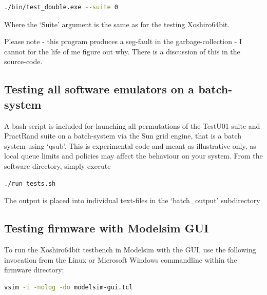 \documentclass{article}
\begin{document}
\begin{minipage}{1.0\textwidth}
\centering
\begin{lstlisting}[language=bash, label=lst:SwTestU01Double]
./bin/test_double.exe --suite 0
\end{lstlisting}
\end{minipage}

Where the `Suite' argument is the same as for the testing Xoshiro64bit.

Please note - this program produces a seg-fault in the garbage-collection - I cannot for the life of me figure out why. There is a discussion of this in the source-code.

\subsection{Testing all software emulators on a batch-system}

A bash-script is included for launching all permutations of the TestU01 suite and PractRand suite on a batch-system via the Sun grid engine, that is a batch system using `qsub'. This is experimental code and meant as illustrative only, as local queue limits and policies may affect the behaviour on your system. From the software directory, simply execute

\begin{minipage}{1.0\textwidth}
\centering
\begin{lstlisting}[language=bash, label=lst:RunTestsSh]
./run_tests.sh
\end{lstlisting}
\end{minipage}

The output is placed into individual text-files in the `batch\_output' subdirectory

\subsection{Testing firmware with Modelsim GUI}

To run the Xoshiro64bit testbench in Modelsim with the GUI, use the following invocation from the Linux or Microsoft Windows commandline within the firmware directory:

\begin{minipage}{1.0\textwidth}
\centering
\begin{lstlisting}[language=bash , label=lst:ModelsimGui]
vsim -i -nolog -do modelsim-gui.tcl
\end{lstlisting}
\end{minipage}
\end{document}
